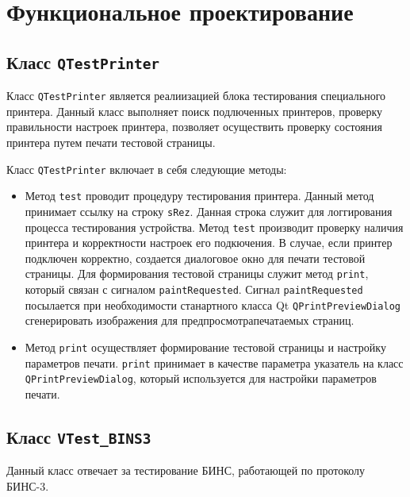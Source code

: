 \section{Функциональное проектирование}
\label{sec:func}

\subsection{Класс \texttt{QTestPrinter}}
Класс \texttt{QTestPrinter} является реалиизацией блока тестирования специального принтера.
Данный класс выполняет поиск подлюченных принтеров, проверку правильности настроек принтера,
позволяет осуществить проверку состояния принтера путем печати тестовой страницы.

Класс \texttt{QTestPrinter} включает в себя следующие методы:

\begin{itemize}
	\item Метод \texttt{test} проводит процедуру тестирования принтера. Данный метод принимает ссылку на строку
		\texttt{sRez}. Данная строка служит для логгирования процесса тестирования устройства. Метод \texttt{test} производит
		проверку наличия принтера и корректности настроек его подкючения. В случае, если принтер подключен корректно, создается
		диалоговое окно для печати тестовой страницы. Для формирования тестовой страницы служит метод \texttt{print}, который
		связан с сигналом \texttt{paintRequested}. Сигнал \break\texttt{paintRequested} посылается при необходимости станартного
		класса Qt \texttt{QPrintPreviewDialog} сгенерировать изображения для предпросмотра\break печатаемых страниц.

	\item Метод \texttt{print} осуществляет формирование тестовой страницы и настройку параметров печати. \texttt{print}
		принимает в качестве параметра указатель на класс \texttt{QPrintPreviewDialog}, который используется для настройки
		параметров печати.
\end{itemize}

\subsection{Класс \texttt{VTest\_BINS3}}
Данный класс отвечает за тестирование БИНС, работающей по протоколу БИНС-3.

